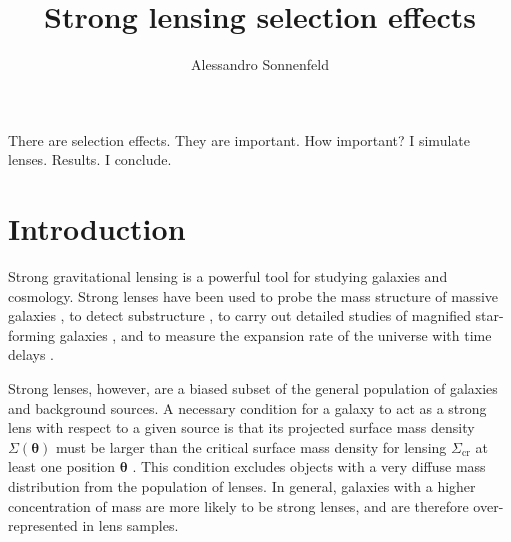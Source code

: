 \documentclass{aa}
\begin{document}
 


   \title{Strong lensing selection effects}

   \author{Alessandro Sonnenfeld
          }


   \date{}

 
  \abstract
    {
There are selection effects. They are important.
}
   {
How important?
} 
   {
I simulate lenses.
}
   {
Results.
}
   {
I conclude.
}

   \maketitle
%

\section{Introduction}\label{sect:intro}

Strong gravitational lensing is a powerful tool for studying galaxies and cosmology.
Strong lenses have been used to probe the mass structure of massive galaxies \citep{Aug++10, ORF14, Son++15, Sha++21}, to detect substructure \citep{Veg++12, Hez++16, Nie++20}, to carry out detailed studies of magnified star-forming galaxies \citep{Jon++13}, and to measure the expansion rate of the universe with time delays \citep[see][for a review]{T+M16}.

Strong lenses, however, are a biased subset of the general population of galaxies and background sources.
A necessary condition for a galaxy to act as a strong lens with respect to a given source is that its projected surface mass density $\Sigma(\boldsymbol\theta)$ must be larger than the critical surface mass density for lensing $\Sigma_{\mathrm{cr}}$ at least one position $\boldsymbol\theta$ \citep{SEF92}.
This condition excludes objects with a very diffuse mass distribution from the population of lenses.
In general, galaxies with a higher concentration of mass are more likely to be strong lenses, and are therefore over-represented in lens samples.
\end{document}
